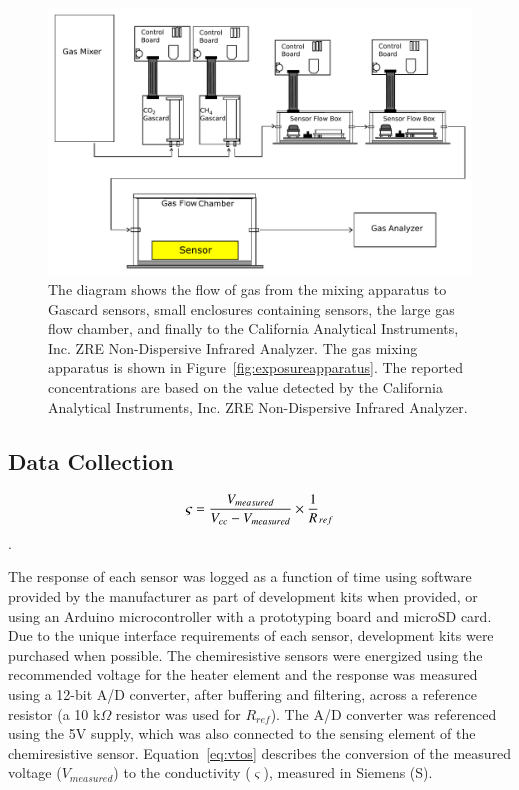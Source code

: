 \documentclass[times]{joehreview}
\begin{document}
	\begin{figure}[!t]
		\centering
		\includegraphics[width=\columnwidth]{honey2.pdf}
		\caption{The diagram shows the flow of gas from the mixing apparatus to Gascard sensors, small enclosures containing sensors, the large gas flow chamber, and finally to the California Analytical Instruments, Inc. ZRE Non-Dispersive Infrared Analyzer.  The gas mixing apparatus is shown in Figure~\ref{fig:exposureapparatus}.  The reported concentrations are based on the value detected by the California Analytical Instruments, Inc. ZRE Non-Dispersive Infrared Analyzer.}
		\label{fig:exposureapparatus2}
	\end{figure}
	
	
	\subsection*{Data Collection}
	
	\begin{equation}
	\label{eq:vtos}
	\varsigma = \frac{V_{measured}}{V_{cc}-V_{measured}}\times \frac{1}R_{ref}\\
	\end{equation}.
	
	The response of each sensor was logged as a function of time using software provided by the manufacturer as part of development kits when provided, or using an Arduino microcontroller with a prototyping board and microSD card. Due to the unique interface requirements of each sensor, development kits were purchased when possible.  The chemiresistive sensors were energized using the recommended voltage for the heater element and the response was measured using a 12-bit A/D converter, after buffering and filtering, across a reference resistor (a 10 k$\Omega$ resistor was used for $R_{ref}$).  The A/D converter was referenced using the 5V supply, which was also connected to the sensing element of the chemiresistive sensor. Equation~\ref{eq:vtos} describes the conversion of the measured voltage ($V_{measured}$) to the conductivity ($\varsigma$), measured in Siemens (S).
	
\end{document}
